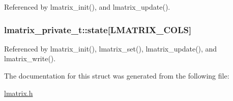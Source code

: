 Referenced by lmatrix\_\-init(), and lmatrix\_\-update().\hypertarget{structlmatrix__private__t_3c1b8785b58a346d07088c4dffa49be6}{
\subsubsection{ {\bf lmatrix\_\-private\_\-t::state}\mbox{[}LMATRIX\_\-COLS\mbox{]}}}
\label{structlmatrix__private__t_3c1b8785b58a346d07088c4dffa49be6}




Referenced by lmatrix\_\-init(), lmatrix\_\-set(), lmatrix\_\-update(), and lmatrix\_\-write().

The documentation for this struct was generated from the following file:\begin{CompactItemize}
\item 
\hyperlink{lmatrix_8h}{lmatrix.h}\end{CompactItemize}
